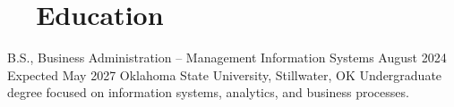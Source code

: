 \section[Education]{\faGraduationCap~~Education}

\education
{B.S., Business Administration -- Management Information Systems}
{August 2024}
{Expected May 2027}
{Oklahoma State University, Stillwater, OK}
{Undergraduate degree focused on information systems, analytics, and business processes.}
{}

